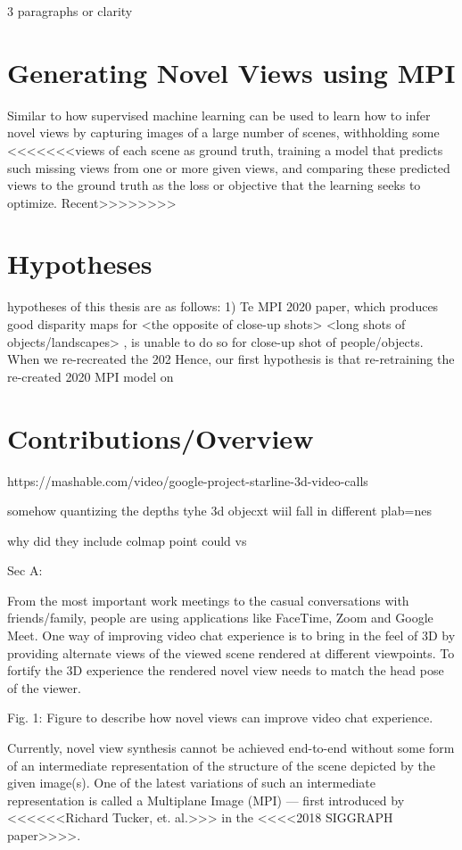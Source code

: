 3 paragraphs or clarity

\section{Generating Novel Views using MPI}

Similar to how supervised machine learning can be used to learn how to infer novel views by capturing images of a large number of scenes, withholding some
<<<<<<<views of each scene as ground truth, training a model that predicts
such missing views from one or more given views, and comparing
these predicted views to the ground truth as the loss or objective
that the learning seeks to optimize. Recent>>>>>>>>

\section{Hypotheses}

 hypotheses of this thesis are as follows:
1) Te MPI 2020 paper, which produces good disparity maps for <the opposite of close-up shots> <long shots of objects/landscapes> \cite{}, is unable to do so for close-up shot of people/objects. When we re-recreated the 202 Hence, our first hypothesis is that re-retraining the re-created 2020 MPI model on  

\section{Contributions/Overview}



https://mashable.com/video/google-project-starline-3d-video-calls

somehow quantizing the depths 
tyhe 3d objecxt wiil fall in different plab=nes

why did they include colmap point could vs 

 Sec A: 

From the most important work meetings to the casual conversations with friends/family, people are using applications like FaceTime, Zoom and Google Meet. One way of improving video chat experience is to bring in the feel of 3D by providing alternate views of the viewed scene rendered at different viewpoints. To fortify the 3D experience the rendered novel view needs to match the head pose of the viewer. 


Fig. 1: Figure to describe how novel views can improve video chat experience. 

Currently, novel view synthesis cannot be achieved end-to-end without some form of an intermediate representation of the structure of the scene depicted by the given image(s). One of the latest variations of such an intermediate representation is called a Multiplane Image (MPI) --- first introduced by <<<<<<Richard Tucker, et. al.>>> in the <<<<2018 SIGGRAPH paper>>>>.

